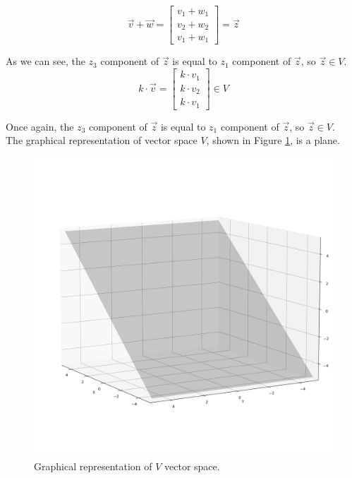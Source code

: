 $$
\vec v + \vec w = \begin{bmatrix}
    v_1 + w_1\\
    v_2 + w_2 \\
    v_1 + w_1
\end{bmatrix} = \vec z
$$

As we can see, the $z_3$ component of $\vec z$ is equal to $z_1$ component of $\vec z$, so $\vec z \in V$.
$$
k \cdot \vec v = \begin{bmatrix}
    k \cdot v_1 \\
    k \cdot v_2 \\
    k \cdot v_1
\end{bmatrix} \in V
$$

Once again, the $z_3$ component of $\vec z$ is equal to $z_1$ component of $\vec z$, so $\vec z \in V$.
\\

The graphical representation of vector space $V$, shown in Figure \ref{fig:vector-space-ex}, is a plane.

\begin{figure}[h]
    \centering
    \includegraphics[scale=0.39]{Images/vector-space-ex.png}
    \caption{Graphical representation of $V$ vector space.}
    \label{fig:vector-space-ex}
\end{figure}
